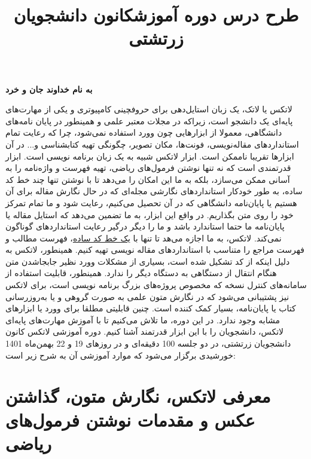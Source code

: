 \documentclass{article}
\begin{document}
\textbf{به نام خداوند جان و خرد}
\begin{flushright}
\vspace{5mm}
\title*{\textbf{\fontsize{31pt}{36pt}\selectfont \textcolor{BrickRed}{طرح درس دوره آموزش}}}
\end{flushright}
\title*{\textbf{\fontsize{180pt}{36pt}\selectfont \textcolor{BrickRed}{\lr{\LaTeX}}}}
\begin{flushleft}
\title*{\textbf{\fontsize{31pt}{36pt}\selectfont \textcolor{BrickRed}{کانون دانشجویان زرتشتی}}}
\end{flushleft}
\vspace{5mm}

لاتکس یا لاتک، یک زبان استایل‌دهی برای حروفچینی کامپیوتری و یکی از مهارت‌های پایه‌ای یک دانشجو است، زیراکه در مجلات معتبر علمی و همینطور در پایان نامه‌های دانشگاهی، معمولا از ابزارهایی چون وورد استفاده نمی‌شود، چرا که رعایت تمام استاندارد‌های مقاله‌نویسی، فونت‌‌‌‌‌‌‌‌‌‌‌‌‌‌‌‌‌‌‌‌‌ها، مکان تصویر، چگونگی تهیه کتابشناسی و... در آن ابزارها تقریبا ناممکن است. ابزار لاتکس شبیه به یک زبان برنامه نویسی است. ابزار قدرتمندی است که نه تنها نوشتن فرمول‌های ریاضی، تهیه فهرست و واژه‌نامه را به آسانی ممکن می‌سازد، بلکه به ما این امکان را می‌دهد تا با نوشتن تنها چند خط کد ساده، به طور خودکار استانداردهای نگارشی مجله‌ای که در حال نگارش مقاله برای آن هستیم یا پایان‌نامه دانشگاهی که در آن تحصیل می‌کنیم، رعایت شود و ما تمام تمرکز خود را روی متن بگذاریم. در واقع این ابزار، به ما تضمین می‌دهد که استایل مقاله یا پایان‌نامه ما حتما استاندارد باشد و ما را دیگر درگیر رعایت استانداردهای گوناگون نمی‌کند. لاتکس، به ما اجازه می‌هد تا تنها با \underline{یک خط کد ساده}، فهرست مطالب و فهرست مراجع را متناسب با استانداردهای مقاله نویسی تهیه کنیم. همینطور، لاتکس به دلیل اینکه از کد تشکیل شده است، بسیاری از مشکلات وورد نظیر جابجاشدن متن هنگام انتقال از دستگاهی به دستگاه دیگر را ندارد. همینطور، قابلیت استفاده از سامانه‌های کنترل نسخه که مخصوص پروژه‌های بزرگ برنامه نویسی است، برای لاتکس نیز پشتیبانی می‌شود که در نگارش متون علمی به صورت گروهی و یا به‌روزرسانی کتاب یا پایان‌نامه، بسیار کمک کننده است. چنین قابلیتی مطلقا برای وورد یا ابزارهای مشابه وجود ندارد. در این دوره، ما تلاش می‌کنیم تا با آموزش مهارت‌های پایه‌ای لاتکس، دانشجویان را با این ابزار قدرتمند آشنا کنیم.
\newpage
دوره آموزشی لاتکس کانون دانشجویان زرتشتی، در دو جلسه 100 دقیقه‌ای و در روزهای 19 و 22 بهمن‌ماه 1401 خورشیدی برگزار می‌شود که موارد آموزشی آن به شرح زیر است:




\section{معرفی لاتکس، نگارش متون، گذاشتن عکس و مقدمات نوشتن فرمول‌های ریاضی}
\end{document}
